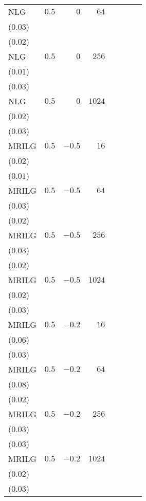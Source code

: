 \begin{table}[t]
\begin{tabular}{lrrrrrrr}
NLG & \(0.5\) & \(0\) & \(64\) & \longcell{\(0.23\)\\{\tiny(\(0.03\))}} & \longcell{\(0.06\)\\{\tiny(\(0.02\))}} \\[2.2ex]
NLG & \(0.5\) & \(0\) & \(256\) & \longcell{\(0.35\)\\{\tiny(\(0.01\))}} & \longcell{\(0.08\)\\{\tiny(\(0.03\))}} \\[2.2ex]
NLG & \(0.5\) & \(0\) & \(1024\) & \longcell{\(0.41\)\\{\tiny(\(0.02\))}} & \longcell{\(0.08\)\\{\tiny(\(0.03\))}} \\[2.2ex]
MRILG & \(0.5\) & \(-0.5\) & \(16\) & \longcell{\(0.13\)\\{\tiny(\(0.02\))}} & \longcell{\(0.04\)\\{\tiny(\(0.01\))}} \\[2.2ex]
MRILG & \(0.5\) & \(-0.5\) & \(64\) & \longcell{\(0.26\)\\{\tiny(\(0.03\))}} & \longcell{\(0.07\)\\{\tiny(\(0.02\))}} \\[2.2ex]
MRILG & \(0.5\) & \(-0.5\) & \(256\) & \longcell{\(0.37\)\\{\tiny(\(0.03\))}} & \longcell{\(0.08\)\\{\tiny(\(0.02\))}} \\[2.2ex]
MRILG & \(0.5\) & \(-0.5\) & \(1024\) & \longcell{\(0.40\)\\{\tiny(\(0.02\))}} & \longcell{\(0.08\)\\{\tiny(\(0.03\))}} \\[2.2ex]
MRILG & \(0.5\) & \(-0.2\) & \(16\) & \longcell{\(0.10\)\\{\tiny(\(0.06\))}} & \longcell{\(0.04\)\\{\tiny(\(0.03\))}} \\[2.2ex]
MRILG & \(0.5\) & \(-0.2\) & \(64\) & \longcell{\(0.22\)\\{\tiny(\(0.08\))}} & \longcell{\(0.04\)\\{\tiny(\(0.02\))}} \\[2.2ex]
MRILG & \(0.5\) & \(-0.2\) & \(256\) & \longcell{\(0.35\)\\{\tiny(\(0.03\))}} & \longcell{\(0.09\)\\{\tiny(\(0.03\))}} \\[2.2ex]
MRILG & \(0.5\) & \(-0.2\) & \(1024\) & \longcell{\(0.42\)\\{\tiny(\(0.02\))}} & \longcell{\(0.09\)\\{\tiny(\(0.03\))}} \\[2.2ex]

\end{tabular}
\end{table}
